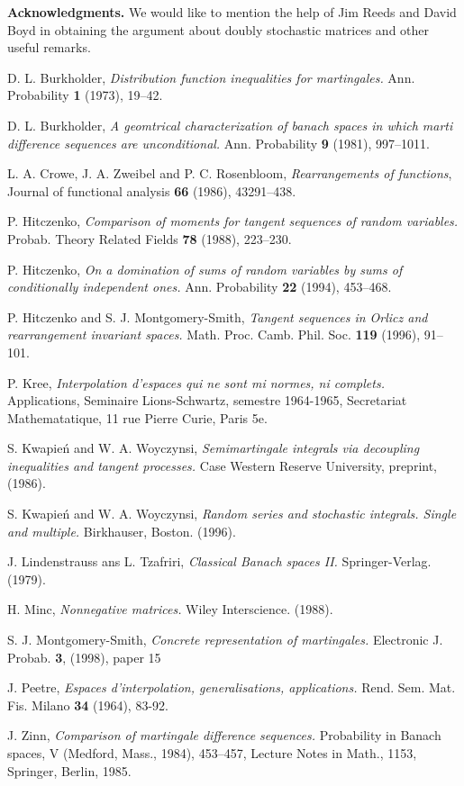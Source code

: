 \documentclass[12pt]{amsart}
\begin{document}
{\bf Acknowledgments.} We would like to mention the help of Jim
Reeds and David Boyd in obtaining the argument about doubly
stochastic matrices and other useful remarks.


\begin{thebibliography}{10}
 D. L. Burkholder, \textit{Distribution function inequalities for martingales.} Ann.
Probability \textbf{1} (1973), 19--42.

 D. L. Burkholder, \textit{A geomtrical characterization of banach spaces in which
marti difference sequences are unconditional.} Ann. Probability
\textbf{9} (1981), 997--1011.

 L. A. Crowe, J. A. Zweibel and P. C. Rosenbloom, \textit{Rearrangements of functions},
Journal of functional analysis \textbf{66} (1986), 43291--438.

 P. Hitczenko, \textit{Comparison of moments for tangent sequences of random variables.}
Probab. Theory Related Fields \textbf{78} (1988), 223--230.

 P. Hitczenko, \textit{On a domination of sums of random variables by sums of conditionally
independent ones.} Ann. Probability \textbf{22} (1994), 453--468.

 P. Hitczenko and S. J. Montgomery-Smith, \textit{Tangent sequences in Orlicz and
rearrangement invariant spaces.} Math. Proc. Camb. Phil. Soc.
\textbf{119} (1996), 91--101.

 P. Kree, \textit{Interpolation d'espaces qui ne sont mi normes, ni complets.} Applications,
Seminaire Lions-Schwartz, semestre 1964-1965, Secretariat Mathematatique, 11 rue Pierre Curie, Paris 5e.

 S. Kwapie\'n and W. A. Woyczynsi, \textit{Semimartingale integrals
via decoupling inequalities and tangent processes.} Case Western Reserve University, preprint, (1986).

 S. Kwapie\'n and W. A. Woyczynsi, \textit{Random series and stochastic integrals. Single and
 multiple.} Birkhauser, Boston. (1996).

 J. Lindenstrauss ans L. Tzafriri, 
\textit{Classical Banach spaces II.} Springer-Verlag. (1979).

 H. Minc, \textit{Nonnegative matrices.} Wiley Interscience. (1988).

 S. J. Montgomery-Smith, \textit{Concrete representation of
martingales.} Electronic J. Probab. \textbf{3}, (1998), paper 15

 J. Peetre, \textit{Espaces d'interpolation, generalisations,
applications.} Rend. Sem. Mat. Fis. Milano \textbf{34} (1964),
83-92.

 J. Zinn, \textit{Comparison of martingale difference sequences.}
Probability in Banach spaces, V (Medford, Mass., 1984), 453--457, Lecture Notes
in Math., 1153, Springer, Berlin, 1985.

\end{thebibliography}
\end{document}
